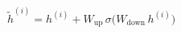 \documentclass[border=10pt]{standalone}
\begin{document}
$\displaystyle \tilde{h}^{(i)} = h^{(i)} + W_{\text{up}}\,\sigma\!\bigl(W_{\text{down}}\,h^{(i)}\bigr)$
\end{document}
